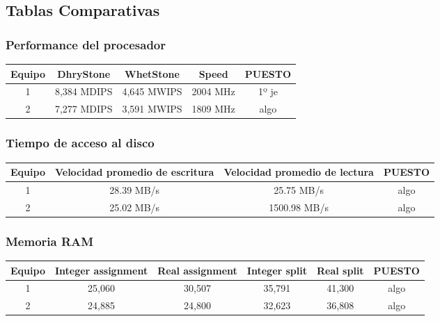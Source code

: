 \subsection{Tablas Comparativas}

\subsubsection{Performance del procesador}
\begin{center}
\begin{tabular}{|ccccc|} \hline
\footnotesize\textbf{Equipo} & \footnotesize\textbf{DhryStone} & \footnotesize\textbf{WhetStone} & \footnotesize\textbf{Speed} & \footnotesize\textbf{PUESTO} \\\hline
1 & 8,384 MDIPS & 4,645 MWIPS & 2004 MHz & 1º je \\\hline
2 & 7,277 MDIPS & 3,591 MWIPS & 1809 MHz & algo \\\hline
\end{tabular}
\end{center}

\subsubsection{Tiempo de acceso al disco}
\begin{center}
\begin{tabular}{|cccc|} \hline
\footnotesize\textbf{Equipo} & \footnotesize\textbf{Velocidad promedio de escritura} & \footnotesize\textbf{Velocidad promedio de lectura} & \footnotesize\textbf{PUESTO} \\\hline
1 & 28.39 MB/s & 25.75 MB/s & algo \\\hline
2 & 25.02 MB/s & 1500.98 MB/s & algo \\\hline
\end{tabular}
\end{center}

\subsubsection{Memoria RAM}
\begin{center}
\begin{tabular}{|cccccc|} \hline
\footnotesize\textbf{Equipo} & \footnotesize\textbf{Integer assignment} & \footnotesize\textbf{Real assignment} & \footnotesize\textbf{Integer split} & \footnotesize\textbf{Real split} & \footnotesize\textbf{PUESTO} \\\hline
1 & 25,060 & 30,507 & 35,791 & 41,300 & algo \\\hline
2 & 24,885 & 24,800 & 32,623 & 36,808 & algo \\\hline
\end{tabular}
\end{center}

